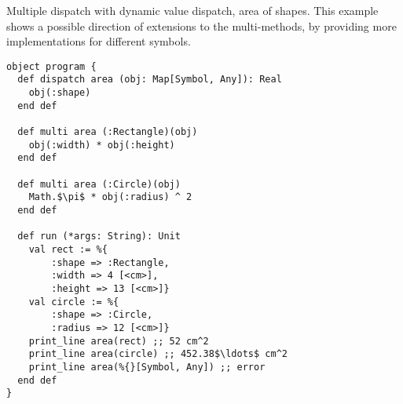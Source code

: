 \example Multiple dispatch with dynamic value dispatch, area of shapes. This example shows a possible direction of extensions to the multi-methods, by providing more implementations for different symbols. 
\begin{lstlisting}
object program {
  def dispatch area (obj: Map[Symbol, Any]): Real
    obj(:shape)
  end def
  
  def multi area (:Rectangle)(obj)
    obj(:width) * obj(:height)
  end def
  
  def multi area (:Circle)(obj)
    Math.$\pi$ * obj(:radius) ^ 2
  end def
  
  def run (*args: String): Unit
    val rect := %{
        :shape => :Rectangle,
        :width => 4 [<cm>],
        :height => 13 [<cm>]}
    val circle := %{
        :shape => :Circle,
        :radius => 12 [<cm>]}
    print_line area(rect) ;; 52 cm^2
    print_line area(circle) ;; 452.38$\ldots$ cm^2
    print_line area(%{}[Symbol, Any]) ;; error
  end def
}
\end{lstlisting}















